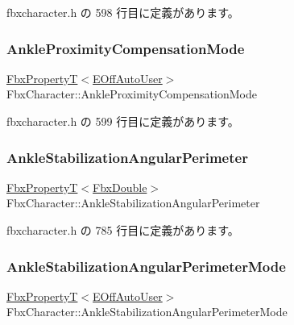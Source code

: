  fbxcharacter.\+h の 598 行目に定義があります。

\mbox{\label{class_fbx_character_a13fbced2f7ec82a05ec62aa84bc9b686}} 
\subsubsection{\texorpdfstring{Ankle\+Proximity\+Compensation\+Mode}{AnkleProximityCompensationMode}}
{\footnotesize\ttfamily \hyperlink{class_fbx_property_t}{Fbx\+PropertyT}$<$\hyperlink{class_fbx_character_ab698a180e6f900ba8317257749c2ecce}{E\+Off\+Auto\+User}$>$ Fbx\+Character\+::\+Ankle\+Proximity\+Compensation\+Mode}



 fbxcharacter.\+h の 599 行目に定義があります。

\mbox{\label{class_fbx_character_a840b9b40bcdb89d082b95648dd5bf01e}} 
\subsubsection{\texorpdfstring{Ankle\+Stabilization\+Angular\+Perimeter}{AnkleStabilizationAngularPerimeter}}
{\footnotesize\ttfamily \hyperlink{class_fbx_property_t}{Fbx\+PropertyT}$<$\hyperlink{fbxtypes_8h_a171e72a1c46fc15c1a6c9c31948c1c5b}{Fbx\+Double}$>$ Fbx\+Character\+::\+Ankle\+Stabilization\+Angular\+Perimeter}



 fbxcharacter.\+h の 785 行目に定義があります。

\mbox{\label{class_fbx_character_a4e2e43a909f4393c6fbc8a8e98caa473}} 
\subsubsection{\texorpdfstring{Ankle\+Stabilization\+Angular\+Perimeter\+Mode}{AnkleStabilizationAngularPerimeterMode}}
{\footnotesize\ttfamily \hyperlink{class_fbx_property_t}{Fbx\+PropertyT}$<$\hyperlink{class_fbx_character_ab698a180e6f900ba8317257749c2ecce}{E\+Off\+Auto\+User}$>$ Fbx\+Character\+::\+Ankle\+Stabilization\+Angular\+Perimeter\+Mode}



